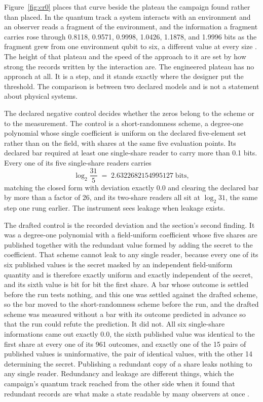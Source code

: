 \documentclass[aps,pre,reprint,nofootinbib]{revtex4-2}
\begin{document}
Figure~\ref{fig:cr0} places that curve beside the plateau the campaign
found rather than placed.  In the quantum track a system interacts
with an environment and an observer reads a fragment of the
environment, and the information a fragment carries rose
through 0.8118, 0.9571, 0.9998, 1.0426, 1.1878, and 1.9996 bits as
the fragment grew from one environment qubit to six, a different value
at every size \cite{Gen2Paper}.
The height of that plateau and the speed of the approach to it are set
by how strong the records written by the interaction are.  The engineered
plateau has no approach at all.  It is a step, and it stands exactly
where the designer put the threshold.  The comparison is between two
declared models and is not a statement about physical systems.

The declared negative control decides whether the zeros belong to the
scheme or to the measurement.  The control is a short-randomness
scheme, a degree-one polynomial whose single coefficient is uniform on
the declared five-element set rather than on the field, with shares at
the same five evaluation points.  Its declared bar required at least
one single-share reader to carry more than 0.1 bits.  Every one of its
five single-share readers carries
\begin{equation}
  \log_2\frac{31}{5} \;=\; 2.6322682154995127 \;\text{bits},
  \label{eq:l2}
\end{equation}
matching the closed form with deviation exactly $0.0$ and clearing the
declared bar by more than a factor of 26, and its two-share readers all sit at
$\log_2 31$, the same step one rung earlier.  The instrument sees
leakage when leakage exists.

The drafted control is the recorded deviation and the section's second
finding.  It was a degree-one polynomial with a field-uniform
coefficient whose five shares are published together with the
redundant value formed by adding the secret to the coefficient.  That
scheme cannot leak to any single reader, because every one of its six
published values is the secret masked by an independent field-uniform
quantity and is therefore exactly uniform and exactly independent of
the secret, and its sixth value is bit for bit the first share.  A bar
whose outcome is settled before the run tests nothing, and this one
was settled against the drafted scheme, so the bar moved to the
short-randomness scheme before the run, and the
drafted scheme was measured without a bar with its outcome predicted
in advance so that the run could refute the prediction.  It did not.
All six single-share informations came out exactly $0.0$, the sixth
published value was identical to the first share at every one of its
961 outcomes, and exactly one of the 15 pairs of published values is
uninformative, the pair of identical values, with the other 14
determining the secret.  Publishing a redundant copy of a share leaks
nothing to any single reader.  Redundancy and leakage are different
things, which the campaign's quantum track reached from the other
side when it found that redundant records are what make a state
readable by many observers at once \cite{Gen2Paper}.
\end{document}
